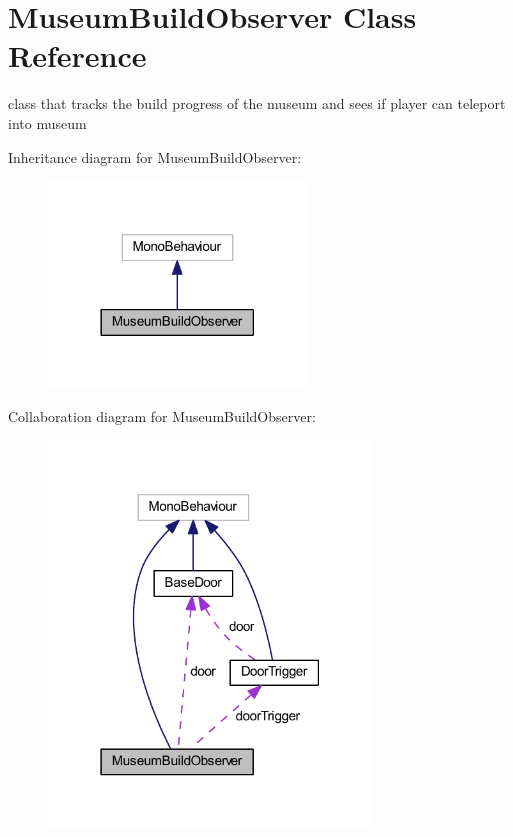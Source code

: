 \hypertarget{class_museum_build_observer}{}\section{Museum\+Build\+Observer Class Reference}
\label{class_museum_build_observer}


class that tracks the build progress of the museum and sees if player can teleport into museum  




Inheritance diagram for Museum\+Build\+Observer\+:
\nopagebreak
\begin{figure}[H]
\begin{center}
\leavevmode
\includegraphics[width=194pt]{class_museum_build_observer__inherit__graph}
\end{center}
\end{figure}


Collaboration diagram for Museum\+Build\+Observer\+:
\nopagebreak
\begin{figure}[H]
\begin{center}
\leavevmode
\includegraphics[width=243pt]{class_museum_build_observer__coll__graph}
\end{center}
\end{figure}
